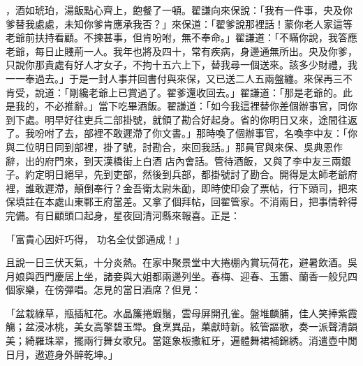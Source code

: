 ，酒如琥珀，湯飯點心齊上，飽餐了一頓。翟謙向來保說：「我有一件事，央及你爹替我處處，未知你爹肯應承我否？」來保道：「翟爹說那裡話！蒙你老人家這等老爺前扶持看顧。不揀甚事，但肯吩咐，無不奉命。」翟謙道：「不瞞你說，我答應老爺，每日止賤荊一人。我年也將及四十，常有疾病，身邊通無所出。央及你爹，只說你那貴處有好人才女子，不拘十五六上下，替我尋一個送來。該多少財禮，我一一奉過去。」于是一封人事并回書付與來保，又已送二人五兩盤纏。來保再三不肯受，說道：「剛纔老爺上已賞過了。翟爹還收回去。」翟謙道：「那是老爺的。此是我的，不必推辭。」當下吃畢酒飯。翟謙道：「如今我這裡替你差個辦事官，同你到下處。明早好往吏兵二部掛號，就領了勘合好起身。省的你明日又來，途間往返了。我吩咐了去，部裡不敢遲滯了你文書。」那時喚了個辦事官，名喚李中友：「你與二位明日同到部裡，掛了號，討勘合，來回我話。」那員官與來保、吳典恩作辭，出的府門來，到天漢橋街上白酒 店內會話。管待酒飯，又與了李中友三兩銀子。約定明日絕早，先到吏部，然後到兵部，都掛號討了勘合。開得是太師老爺府裡，誰敢遲滯，顛倒奉行？金吾衛太尉朱勔，即時使印僉了票帖，行下頭司，把來保填註在本處山東鄆王府當差。又拿了個拜帖，回翟管家。不消兩日，把事情幹得完備。有日顧頭口起身，星夜回清河縣來報喜。正是：

「富貴心因奸巧得，  功名全仗鄧通成！」

且說一日三伏天氣，十分炎熱。在家中聚景堂中大捲棚內賞玩荷花，避暑飲酒。吳月娘與西門慶居上坐，諸妾與大姐都兩邊列坐。春梅、迎春、玉簫、蘭香一般兒四個家樂，在傍彈唱。怎見的當日酒席？但見：

「盆栽綠草，瓶插紅花。水晶簾捲蝦鬚，雲母屏開孔雀。盤堆麟脯，佳人笑捧紫霞觴；盆浸冰桃，美女高擎碧玉斝。食烹異品，菓獻時新。絃管謳歌，奏一派聲清韻美；綺羅珠翠，擺兩行舞女歌兒。當筵象板撒紅牙，遍體舞裙補錦綉。消遣壺中閒日月，遨遊身外醉乾坤。」

